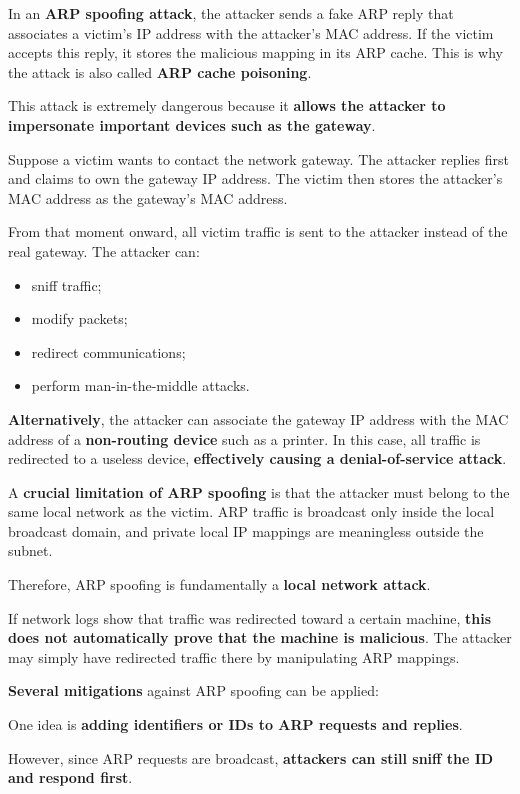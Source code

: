 \documentclass{article}
\begin{document}
In an \textbf{ARP spoofing attack}, the attacker sends a fake ARP reply that associates a victim's IP address with the attacker's MAC address. If the victim accepts this reply, it stores the malicious mapping in its ARP cache. This is why the attack is also called \textbf{ARP cache poisoning}.

This attack is extremely dangerous because it \textbf{allows the attacker to impersonate important devices such as the gateway}.

Suppose a victim wants to contact the network gateway. The attacker replies first and claims to own the gateway IP address. The victim then stores the attacker's MAC address as the gateway's MAC address.

From that moment onward, all victim traffic is sent to the attacker instead of the real gateway. The attacker can:

\begin{itemize}
\item sniff traffic;
\item modify packets;
\item redirect communications;
\item perform man-in-the-middle attacks.
\end{itemize}

\textbf{Alternatively}, the attacker can associate the gateway IP address with the MAC address of a \textbf{non-routing device} such as a printer. In this case, all traffic is redirected to a useless device, \textbf{effectively causing a denial-of-service attack}.

A \textbf{crucial limitation of ARP spoofing} is that the attacker must belong to the same local network as the victim. ARP traffic is broadcast only inside the local broadcast domain, and private local IP mappings are meaningless outside the subnet.

Therefore, ARP spoofing is fundamentally a \textbf{local network attack}.

If network logs show that traffic was redirected toward a certain machine, \textbf{this does not automatically prove that the machine is malicious}. The attacker may simply have redirected traffic there by manipulating ARP mappings.

\textbf{Several mitigations} against ARP spoofing can be applied:

One idea is \textbf{adding identifiers or IDs to ARP requests and replies}.

However, since ARP requests are broadcast, \textbf{attackers can still sniff the ID and respond first}.
\end{document}
